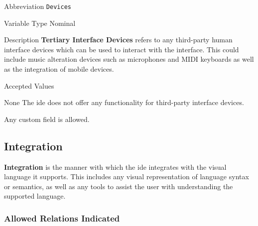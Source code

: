 \begin{AlignedDesc}
  \item[Abbreviation] \texttt{Devices}

  \item[Variable Type] Nominal

  \item[Description] \textbf{Tertiary Interface Devices} refers to any
  third-party human interface devices which can be used to interact with
  the interface. This could include music alteration devices such as
  microphones and MIDI keyboards as well as the integration of mobile
  devices.

  \item[Accepted Values]

  \begin{AlignedDesc}
    \item[None] The \ac{ide} does not offer any functionality for
    third-party interface devices.
    \item[\textellipsis] Any custom field is allowed.
  \end{AlignedDesc}

\end{AlignedDesc}


\subsection{Integration}
\label{subsec:integration}

\textbf{Integration} is the manner with which the \ac{ide} integrates with
the visual language it supports. This includes any visual representation of
language syntax or semantics, as well as any tools to assist the user with
understanding the supported language.

\subsubsection{Allowed Relations Indicated}
\label{subsubsec:relations}

